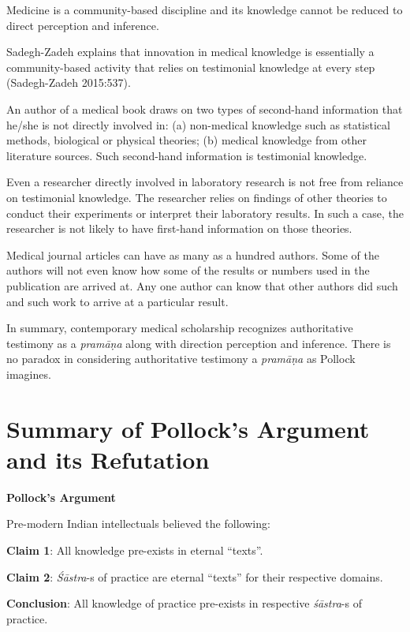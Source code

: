 \newpage

Medicine is a community-based discipline and its knowledge cannot be reduced to direct perception and inference. 

Sadegh-Zadeh explains that innovation in medical knowledge is essentially a community-based activity that relies on testimonial knowledge at every step (Sadegh-Zadeh 2015:537).

An author of a medical book draws on two types of second-hand information that he/she is not directly involved in: (a) non-medical knowledge such as statistical methods, biological or physical theories; (b) medical knowledge from other literature sources.  Such second-hand information is testimonial knowledge.

Even a researcher directly involved in laboratory research is not free from reliance on testimonial knowledge. The researcher relies on findings of other theories to conduct their experiments or interpret their laboratory results. In such a case, the researcher is not likely to have first-hand information on those theories.

Medical journal articles can have as many as a hundred authors. Some of the authors will not even know how some of the results or numbers used in the publication are arrived at. Any one author can know that other authors did such and such work to arrive at a particular result.

In summary, contemporary medical scholarship recognizes authoritative testimony as a {\sl pramāṇa} along with direction perception and inference. There is no paradox in considering authoritative testimony a {\sl pramāṇa} as Pollock imagines.

\section*{Summary of Pollock's Argument and its Refutation}

{\bf Pollock's Argument}

Pre-modern Indian intellectuals believed the following:

{\bf Claim 1}: All knowledge pre-exists in eternal ``texts''.  

{\bf Claim 2}: {\sl Śāstra}-s of practice are eternal ``texts'' for their respective domains.

{\bf Conclusion}:  All knowledge of practice pre-exists in respective {\sl śāstra}-s of practice. 

